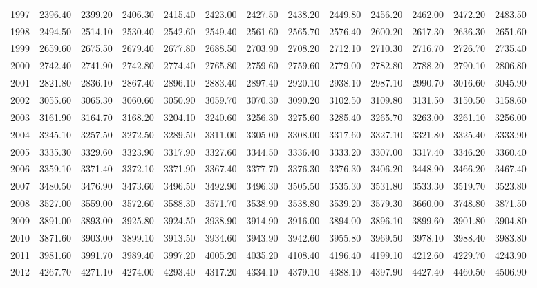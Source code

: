 \begin{longtable}{rrrrrrrrrrrrr}
  1997 & 2396.40 & 2399.20 & 2406.30 & 2415.40 & 2423.00 & 2427.50 & 2438.20 & 2449.80 & 2456.20 & 2462.00 & 2472.20 & 2483.50 \\ 
  1998 & 2494.50 & 2514.10 & 2530.40 & 2542.60 & 2549.40 & 2561.60 & 2565.70 & 2576.40 & 2600.20 & 2617.30 & 2636.30 & 2651.60 \\ 
  1999 & 2659.60 & 2675.50 & 2679.40 & 2677.80 & 2688.50 & 2703.90 & 2708.20 & 2712.10 & 2710.30 & 2716.70 & 2726.70 & 2735.40 \\ 
  2000 & 2742.40 & 2741.90 & 2742.80 & 2774.40 & 2765.80 & 2759.60 & 2759.60 & 2779.00 & 2782.80 & 2788.20 & 2790.10 & 2806.80 \\ 
  2001 & 2821.80 & 2836.10 & 2867.40 & 2896.10 & 2883.40 & 2897.40 & 2920.10 & 2938.10 & 2987.10 & 2990.70 & 3016.60 & 3045.90 \\ 
  2002 & 3055.60 & 3065.30 & 3060.60 & 3050.90 & 3059.70 & 3070.30 & 3090.20 & 3102.50 & 3109.80 & 3131.50 & 3150.50 & 3158.60 \\ 
  2003 & 3161.90 & 3164.70 & 3168.20 & 3204.10 & 3240.60 & 3256.30 & 3275.60 & 3285.40 & 3265.70 & 3263.00 & 3261.10 & 3256.00 \\ 
  2004 & 3245.10 & 3257.50 & 3272.50 & 3289.50 & 3311.00 & 3305.00 & 3308.00 & 3317.60 & 3327.10 & 3321.80 & 3325.40 & 3333.90 \\ 
  2005 & 3335.30 & 3329.60 & 3323.90 & 3317.90 & 3327.60 & 3344.50 & 3336.40 & 3333.20 & 3307.00 & 3317.40 & 3346.20 & 3360.40 \\ 
  2006 & 3359.10 & 3371.40 & 3372.10 & 3371.90 & 3367.40 & 3377.70 & 3376.30 & 3376.30 & 3406.20 & 3448.90 & 3466.20 & 3467.40 \\ 
  2007 & 3480.50 & 3476.90 & 3473.60 & 3496.50 & 3492.90 & 3496.30 & 3505.50 & 3535.30 & 3531.80 & 3533.30 & 3519.70 & 3523.80 \\ 
  2008 & 3527.00 & 3559.00 & 3572.60 & 3588.30 & 3571.70 & 3538.90 & 3538.80 & 3539.20 & 3579.30 & 3660.00 & 3748.80 & 3871.50 \\ 
  2009 & 3891.00 & 3893.00 & 3925.80 & 3924.50 & 3938.90 & 3914.90 & 3916.00 & 3894.00 & 3896.10 & 3899.60 & 3901.80 & 3904.80 \\ 
  2010 & 3871.60 & 3903.00 & 3899.10 & 3913.50 & 3934.60 & 3943.90 & 3942.60 & 3955.80 & 3969.50 & 3978.10 & 3988.40 & 3983.80 \\ 
  2011 & 3981.60 & 3991.70 & 3989.40 & 3997.20 & 4005.20 & 4035.20 & 4108.40 & 4196.40 & 4199.10 & 4212.60 & 4229.70 & 4243.90 \\ 
  2012 & 4267.70 & 4271.10 & 4274.00 & 4293.40 & 4317.20 & 4334.10 & 4379.10 & 4388.10 & 4397.90 & 4427.40 & 4460.50 & 4506.90 \\ 

\end{longtable}
